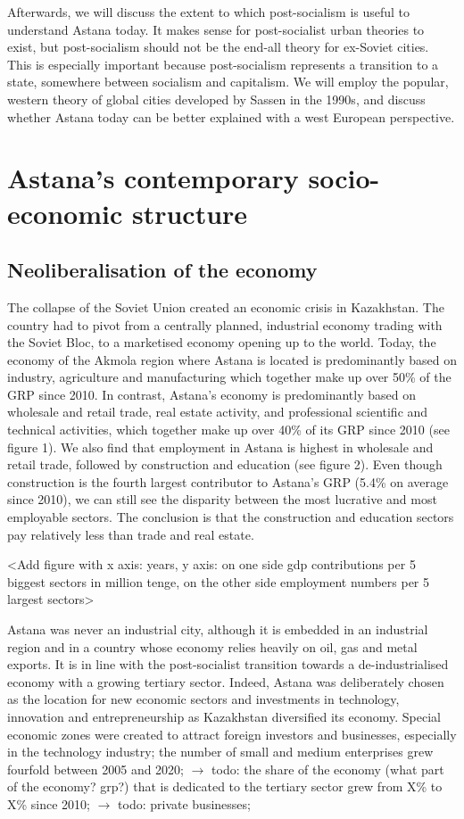 \documentclass{article}
\begin{document}
Afterwards, we will discuss the extent to which post-socialism is useful to understand Astana today. It makes sense for post-socialist urban theories to exist, but post-socialism should not be the end-all theory for ex-Soviet cities. This is especially important because post-socialism represents a transition to a state, somewhere between socialism and capitalism. 
We will employ the popular, western theory of global cities developed by Sassen in the 1990s, and discuss whether Astana today can be better explained with a west European perspective.

\section{Astana's contemporary socio-economic structure}

\subsection{Neoliberalisation of the economy}

The collapse of the Soviet Union created an economic crisis in Kazakhstan. The country had to pivot from a centrally planned, industrial economy trading with the Soviet Bloc, to a marketised economy opening up to the world. Today, the economy of the Akmola region where Astana is located is predominantly based on industry, agriculture and manufacturing which together make up over 50\% of the GRP since 2010. In contrast, Astana's economy is predominantly based on wholesale and retail trade, real estate activity, and professional scientific and technical activities, which together make up over 40\% of its GRP since 2010 (see figure 1).  We also find that employment in Astana is highest in wholesale and retail trade, followed by construction and education (see figure 2). Even though construction is the fourth largest contributor to Astana's GRP (5.4\% on average since 2010), we can still see the disparity between the most lucrative and most employable sectors. The conclusion is that the construction and education sectors pay relatively less than trade and real estate.

<Add figure with x axis: years, y axis: on one side gdp contributions per 5 biggest sectors in million tenge, on the other side employment numbers per 5 largest sectors>

Astana was never an industrial city, although it is embedded in an industrial region and in a country whose economy relies heavily on oil, gas and metal exports. It is in line with the post-socialist transition towards a de-industrialised economy with a growing tertiary sector.
Indeed, Astana was deliberately chosen as the location for new economic sectors and investments in technology, innovation and entrepreneurship as Kazakhstan diversified its economy. Special economic zones were created to attract foreign investors and businesses, especially in the technology industry; the number of small and medium enterprises grew fourfold between 2005 and 2020; $\rightarrow$ todo: the share of the economy (what part of the economy? grp?) that is dedicated to the tertiary sector grew from X\% to X\% since 2010; $\rightarrow$ todo: private businesses;
\end{document}
